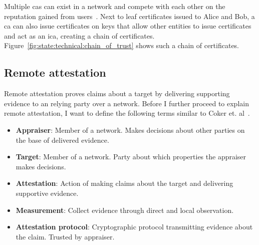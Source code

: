 Multiple \gls{ca}s can exist in a
network and compete with each other on the reputation gained from
users~\cite{perlman1999overview}.
Next to leaf certificates issued to Alice and Bob, a \gls{ca} can also issue
certificates on keys that allow other entities to issue certificates and act as
an \gls{ica}, creating a chain of certificates.
Figure~\ref{fig:state:technical:chain_of_trust} shows such a chain of
certificates.

\subsection{Remote attestation}
\label{sec:20:remote_attestation}
Remote attestation proves claims about a target by delivering supporting
evidence to an relying party over a network. Before I further proceed to explain
remote attestation, I want to define the following terms similar to Coker et.
al~\cite{coker_principles_2011}.
\begin{itemize}
  \item \textbf{Appraiser}: Member of a network. Makes decisions about other
    parties on the base of delivered evidence.
  \item \textbf{Target}: Member of a network. Party about which properties the
    appraiser makes decisions.
  \item \textbf{Attestation}: Action of making claims about the target and
    delivering supportive evidence.
  \item \textbf{Measurement}: Collect evidence through direct and local
    observation.
  \item \textbf{Attestation protocol}: Cryptographic protocol transmitting
    evidence about the claim. Trusted by appraiser.
\end{itemize}

